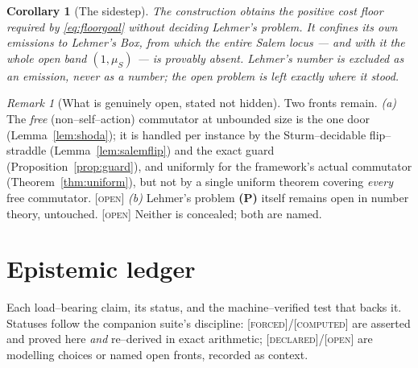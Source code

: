 \documentclass[11pt]{article}
\theoremstyle{plain}
\newtheorem{corollary}[theorem]{Corollary}
\theoremstyle{definition}
\theoremstyle{remark}
\newtheorem{remark}[theorem]{Remark}
\newcommand{\forced}{\textcolor{forcedc}{\textsc{[forced]}}}
\newcommand{\declared}{\textcolor{declaredc}{\textsc{[declared]}}}
\newcommand{\openq}{\textcolor{openc}{\textsc{[open]}}}
\newcommand{\computed}{\textcolor{forcedc}{\textsc{[computed]}}}
\begin{document}
\begin{corollary}[The sidestep]\label{cor:sidestep}
The construction obtains the positive cost floor required by \eqref{eq:floorgoal} without deciding Lehmer's problem. It confines its own emissions to Lehmer's Box, from which the entire Salem locus --- and with it the whole open band $(1,\mu_S)$ --- is provably absent. Lehmer's number is excluded as an emission, never as a number; the open problem is left exactly where it stood.
\end{corollary}

\begin{remark}[What is genuinely open, stated not hidden]\label{rem:residue}
Two fronts remain. \emph{(a)} The \emph{free} (non--self--action) commutator at unbounded size is the one door (Lemma~\ref{lem:shoda}); it is handled per instance by the Sturm--decidable flip--straddle (Lemma~\ref{lem:salemflip}) and the exact guard (Proposition~\ref{prop:guard}), and uniformly for the framework's actual commutator (Theorem~\ref{thm:uniform}), but not by a single uniform theorem covering \emph{every} free commutator. \openq{} \emph{(b)} Lehmer's problem \textbf{(P)} itself remains open in number theory, untouched. \openq{} Neither is concealed; both are named.
\end{remark}

\section{Epistemic ledger}\label{sec:ledger}

Each load--bearing claim, its status, and the machine--verified test that backs it. Statuses follow the companion suite's discipline: \forced{}/\computed{} are asserted and proved here \emph{and} re--derived in exact arithmetic; \declared{}/\openq{} are modelling choices or named open fronts, recorded as context.
\end{document}
